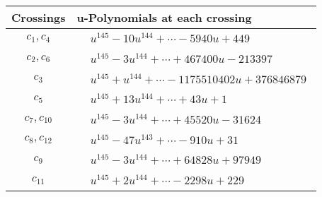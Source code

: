 \documentclass[1p]{elsarticle_modified}
\theoremstyle{definition}
\begin{document}
\begin{tabular}{m{50pt}|m{274pt}}
Crossings & \hspace{64pt}u-Polynomials at each crossing \\
\hline $$\begin{aligned}c_{1},c_{4}\end{aligned}$$&$\begin{aligned}
&u^{145}-10 u^{144}+\cdots-5940 u+449
\end{aligned}$\\
\hline $$\begin{aligned}c_{2},c_{6}\end{aligned}$$&$\begin{aligned}
&u^{145}-3 u^{144}+\cdots+467400 u-213397
\end{aligned}$\\
\hline $$\begin{aligned}c_{3}\end{aligned}$$&$\begin{aligned}
&u^{145}+u^{144}+\cdots-1175510402 u+376846879
\end{aligned}$\\
\hline $$\begin{aligned}c_{5}\end{aligned}$$&$\begin{aligned}
&u^{145}+13 u^{144}+\cdots+43 u+1
\end{aligned}$\\
\hline $$\begin{aligned}c_{7},c_{10}\end{aligned}$$&$\begin{aligned}
&u^{145}-3 u^{144}+\cdots+45520 u-31624
\end{aligned}$\\
\hline $$\begin{aligned}c_{8},c_{12}\end{aligned}$$&$\begin{aligned}
&u^{145}-47 u^{143}+\cdots-910 u+31
\end{aligned}$\\
\hline $$\begin{aligned}c_{9}\end{aligned}$$&$\begin{aligned}
&u^{145}-3 u^{144}+\cdots+64828 u+97949
\end{aligned}$\\
\hline $$\begin{aligned}c_{11}\end{aligned}$$&$\begin{aligned}
&u^{145}+2 u^{144}+\cdots-2298 u+229
\end{aligned}$\\
\hline
\end{tabular}\\~\\
\end{document}
